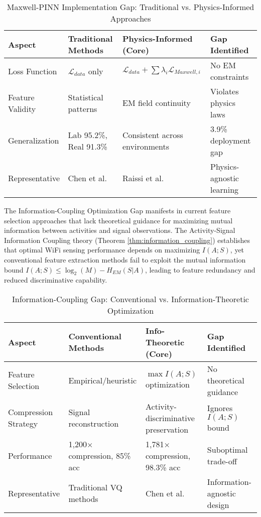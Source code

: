 \documentclass[journal]{IEEEtran}
\begin{document}
\begin{table}[h]
\centering
\caption{Maxwell-PINN Implementation Gap: Traditional vs. Physics-Informed Approaches}
\label{tab:maxwell_pinn_gap}
\begin{tabular}{|p{2.5cm}|p{3cm}|p{3cm}|p{3cm}|}
\hline
\textbf{Aspect} & \textbf{Traditional Methods} & \textbf{Physics-Informed (Core)} & \textbf{Gap Identified} \\
\hline
Loss Function & $\mathcal{L}_{data}$ only & $\mathcal{L}_{data} + \sum \lambda_i \mathcal{L}_{Maxwell,i}$ & No EM constraints \\
\hline
Feature Validity & Statistical patterns & EM field continuity & Violates physics laws \\
\hline
Generalization & Lab 95.2\%, Real 91.3\% & Consistent across environments & 3.9\% deployment gap \\
\hline
Representative & Chen et al. \cite{chen2018wifi} & Raissi et al. \cite{raissi2019physics} & Physics-agnostic learning \\
\hline
\end{tabular}
\end{table}

The Information-Coupling Optimization Gap manifests in current feature selection approaches that lack theoretical guidance for maximizing mutual information between activities and signal observations. The Activity-Signal Information Coupling theory (Theorem \ref{thm:information_coupling}) establishes that optimal WiFi sensing performance depends on maximizing $I(A;S)$, yet conventional feature extraction methods fail to exploit the mutual information bound $I(A;S) \leq \log_2(M) - H_{EM}(S|A)$, leading to feature redundancy and reduced discriminative capability.

\begin{table}[h]
\centering
\caption{Information-Coupling Gap: Conventional vs. Information-Theoretic Optimization}
\label{tab:information_coupling_gap}
\begin{tabular}{|p{2.5cm}|p{3cm}|p{3cm}|p{3cm}|}
\hline
\textbf{Aspect} & \textbf{Conventional Methods} & \textbf{Info-Theoretic (Core)} & \textbf{Gap Identified} \\
\hline
Feature Selection & Empirical/heuristic & $\max I(A;S)$ optimization & No theoretical guidance \\
\hline
Compression Strategy & Signal reconstruction & Activity-discriminative preservation & Ignores $I(A;S)$ bound \\
\hline
Performance & 1,200× compression, 85\% acc & 1,781× compression, 98.3\% acc & Suboptimal trade-off \\
\hline
Representative & Traditional VQ methods & Chen et al. \cite{chen2024efficientfi} & Information-agnostic design \\
\hline
\end{tabular}
\end{table}
\end{document}
